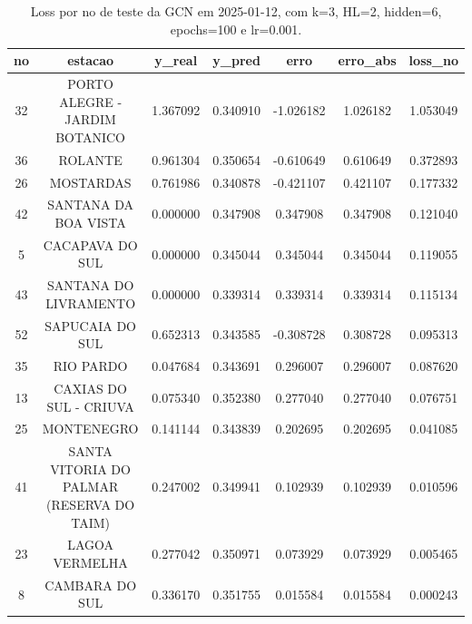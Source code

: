 \begin{table}[h]
\centering
\caption{Loss por no de teste da GCN em 2025-01-12, com k=3, HL=2, hidden=6, epochs=100 e lr=0.001.}
\label{tab:gcn_loss_k3_hl2_h6_e100_d20250112}
\begin{tabular}{ccccccc}
\toprule
no & estacao & y\_real & y\_pred & erro & erro\_abs & loss\_no \\
\midrule
32 & PORTO ALEGRE - JARDIM BOTANICO & 1.367092 & 0.340910 & -1.026182 & 1.026182 & 1.053049 \\
36 & ROLANTE & 0.961304 & 0.350654 & -0.610649 & 0.610649 & 0.372893 \\
26 & MOSTARDAS & 0.761986 & 0.340878 & -0.421107 & 0.421107 & 0.177332 \\
42 & SANTANA DA BOA VISTA & 0.000000 & 0.347908 & 0.347908 & 0.347908 & 0.121040 \\
5 & CACAPAVA DO SUL & 0.000000 & 0.345044 & 0.345044 & 0.345044 & 0.119055 \\
43 & SANTANA DO LIVRAMENTO & 0.000000 & 0.339314 & 0.339314 & 0.339314 & 0.115134 \\
52 & SAPUCAIA DO SUL & 0.652313 & 0.343585 & -0.308728 & 0.308728 & 0.095313 \\
35 & RIO PARDO & 0.047684 & 0.343691 & 0.296007 & 0.296007 & 0.087620 \\
13 & CAXIAS DO SUL - CRIUVA & 0.075340 & 0.352380 & 0.277040 & 0.277040 & 0.076751 \\
25 & MONTENEGRO & 0.141144 & 0.343839 & 0.202695 & 0.202695 & 0.041085 \\
41 & SANTA VITORIA DO PALMAR (RESERVA DO TAIM) & 0.247002 & 0.349941 & 0.102939 & 0.102939 & 0.010596 \\
23 & LAGOA VERMELHA & 0.277042 & 0.350971 & 0.073929 & 0.073929 & 0.005465 \\
8 & CAMBARA DO SUL & 0.336170 & 0.351755 & 0.015584 & 0.015584 & 0.000243 \\
\bottomrule
\end{tabular}
\end{table}
